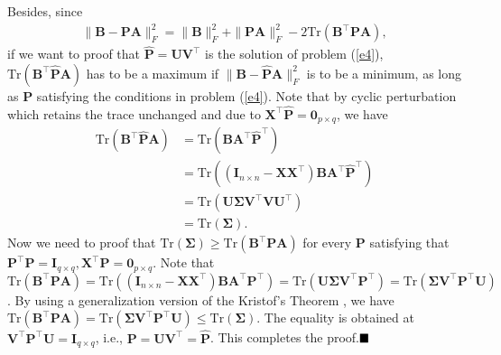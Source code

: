 \documentclass[titlepage,11pt,twoside]{article}
\begin{document}
Besides, since
\begin{equation}
\begin{split}
\|\mathbf{B}-\mathbf{P}\mathbf{A}\|_{F}^{2}
=\|\mathbf{B}\|_{F}^{2}+\|\mathbf{P}\mathbf{A}\|_{F}^{2}-2\text{Tr}(\mathbf{B}^{\top}\mathbf{P}\mathbf{A}),
\end{split}
\end{equation}
if we want to proof that $\mathbf{\hat{P}}=\mathbf{U}\mathbf{V}^{\top}$ is the solution of problem (\ref{e4}), $\text{Tr}(\mathbf{B}^{\top}\mathbf{\hat{P}}\mathbf{A})$ has to be a maximum if $\|\mathbf{B}-\mathbf{\hat{P}}\mathbf{A}\|_{F}^{2}$ is to be a minimum, as long as $\mathbf{P}$ satisfying the conditions in problem (\ref{e4}).
Note that by cyclic perturbation which retains the trace unchanged and due to $\mathbf{X}^{\top}\mathbf{\hat{P}}=\mathbf{0}_{p\times q}$, we have 
\begin{equation}
\begin{split}
\text{Tr}(\mathbf{B}^{\top}\mathbf{\hat{P}}\mathbf{A})
&
=
\text{Tr}(\mathbf{B}\mathbf{A}^{\top}\mathbf{\hat{P}}^{\top})
\\
&
=
\text{Tr}((\mathbf{I}_{n\times n}-\mathbf{X}\mathbf{X}^{\top})\mathbf{B}\mathbf{A}^{\top}\mathbf{\hat{P}}^{\top})
\\
&
=
\text{Tr}(\mathbf{U}\mathbf{\Sigma}\mathbf{V}^{\top}\mathbf{V}\mathbf{U}^{\top})
\\
&
=
\text{Tr}(\mathbf{\Sigma}).
\end{split}
\end{equation}
Now we need to proof that $\text{Tr}(\mathbf{\Sigma})\ge\text{Tr}(\mathbf{B}^{\top}\mathbf{P}\mathbf{A})$ for every $\mathbf{P}$ satisfying that $\mathbf{P}^{\top}\mathbf{P} = \mathbf{I}_{q\times q}, \mathbf{X}^{\top}\mathbf{P} = \mathbf{0}_{p\times q}$. Note that $\text{Tr}(\mathbf{B}^{\top}\mathbf{P}\mathbf{A})
=
\text{Tr}((\mathbf{I}_{n\times n}-\mathbf{X}\mathbf{X}^{\top})\mathbf{B}\mathbf{A}^{\top}\mathbf{P}^{\top})
=
\text{Tr}(\mathbf{U}\mathbf{\Sigma}\mathbf{V}^{\top}\mathbf{P}^{\top})
=
\text{Tr}(\mathbf{\Sigma}\mathbf{V}^{\top}\mathbf{P}^{\top}\mathbf{U})$. 
By using a generalization version \cite{TenBerge1983} of the Kristof's Theorem \cite{Kristof1970515}, we have $\text{Tr}(\mathbf{B}^{\top}\mathbf{P}\mathbf{A})
=
\text{Tr}(\mathbf{\Sigma}\mathbf{V}^{\top}\mathbf{P}^{\top}\mathbf{U})
\le
\text{Tr}(\mathbf{\Sigma})
.
$
The equality is obtained at 
$\mathbf{V}^{\top}\mathbf{P}^{\top}\mathbf{U}=\mathbf{I}_{q\times q}$, i.e., $\mathbf{P}=\mathbf{U}\mathbf{V}^{\top}=\mathbf{\hat{P}}$. This completes the proof.$\hfill\blacksquare$ 
\end{document}
